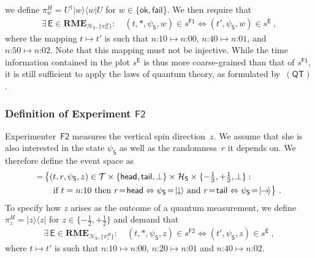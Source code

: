 \documentclass[12pt]{article}
\theoremstyle{plain}
\theoremstyle{definition}
\newcommand*{\cH}{\mathcal{H}}
\newcommand*{\cT}{\mathcal{T}}
\newcommand*{\ket}[1]{{| #1 \rangle}}
\newcommand{\proj}[1]{|#1\rangle\!\langle #1|}
\newcommand*{\Exp}{\mathsf{E}}
\newcommand*{\Friendone}{\mathsf{F1}}
\newcommand*{\Friendtwo}{\mathsf{F2}}
\newcommand*{\Spin}{\mathsf{S}}
\newcommand*{\RME}{\mathbf{RME}}
\newcommand*{\spindown}{\ket{{\hspace{-0.1ex}\downarrow\hspace{-0.1ex}}}}
\newcommand*{\spinright}{\ket{{\hspace{-0.2ex}\rightarrow\hspace{-0.4ex}}}}
\newcommand*{\sminus}{{\textstyle - \frac{1}{2}}}
\newcommand*{\splus}{{\textstyle + \frac{1}{2}}}
\newcommand*{\QT}{\mathsf{(QT)}}
\newcommand*{\ok}{\mathsf{ok}}
\newcommand*{\fail}{\mathsf{fail}}
\newcommand*{\head}{\mathsf{head}}
\newcommand*{\tail}{\mathsf{tail}}
\begin{document}
we define $\pi^H_{w} = U^{\dagger}  \proj{w} U$ for $w \in \{ \ok, \fail$\}. We then require that 
\begin{align} \label{eq_FriendoneM}
 \exists \,   \Exp \in \RME_{\cH_{\Spin}, \{\pi^H_w\}} : \quad  (t, *, \psi_\Spin, w) \in s^{\Friendone} \iff (t', \psi_\Spin, w) \in s^{\Exp} \ ,
\end{align}
where the mapping $t \mapsto t'$ is such that $\text{$n$:10} \mapsto \text{$n$:00}$, $\text{$n$:40} \mapsto \text{$n$:01}$, and $\text{$n$:50} \mapsto \text{$n$:02}$.   Note that this mapping must not be injective. While the time information contained in the plot $s^{\Exp}$ is thus more coarse-grained than that of $s^{\Friendone}$, it is still sufficient to apply the laws of quantum theory, as formulated by~$\QT$.

\subsubsection*{Definition of Experiment $\Friendtwo$}

Experimenter~$\Friendtwo$ measures the vertical spin direction~$z$. We assume that she is also interested in the state $\psi_\Spin$ as well as the randomness~$r$ it depends on. We therefore define the event space as
\begin{align}
  [\Friendtwo]  = \, & \bigl\{(t, r, \psi_\Spin, z)   \in \cT \times \{\head,\tail,\bot\} \times \cH_{\Spin} \times \{\sminus, \splus, \bot\} : \, \nonumber 
\\  & \quad  \text{if } t = \text{$n$:10} \text{ then } r \! = \! \head \Leftrightarrow \psi_{\Spin} \! = \! \spindown \text{ and }  r \! = \! \tail \Leftrightarrow \psi_{\Spin} \! = \! \spinright  \label{eq_Ftworpsi}
 \bigr\} \ .
  \end{align}
  To specify how $z$ arises as the outcome of a quantum measurement, we define $\pi^H_{z} = \proj{z}$  for $z \in \{\sminus, \splus\}$ and demand that  
  \begin{align} \label{eq_FriendtwoM}
 \exists \,  \Exp \in \RME_{\cH_{\Spin}, \{\pi^H_z\}} : \quad  (t, *, \psi_\Spin, z) \in s^{\Friendtwo} \iff (t', \psi_\Spin, z) \in s^{\Exp} \ ,
\end{align}
where $t \mapsto t'$ is such that $\text{$n$:10} \mapsto \text{$n$:00}$, $\text{$n$:20} \mapsto \text{$n$:01}$ and $\text{$n$:40} \mapsto \text{$n$:02}$. 
\end{document}
